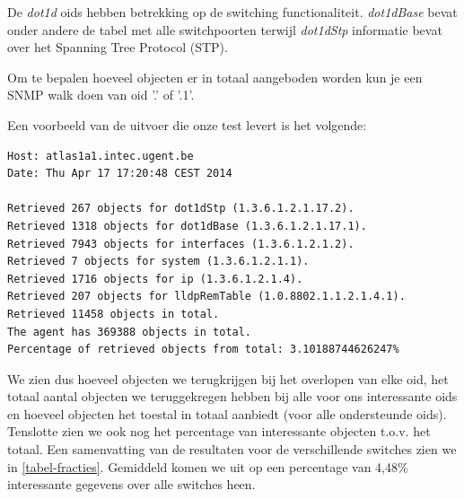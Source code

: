 De \textit{dot1d} \glspl{oid} hebben betrekking op de switching functionaliteit.
\textit{dot1dBase} bevat onder andere de tabel met alle switchpoorten terwijl \textit{dot1dStp} informatie bevat over het Spanning Tree Protocol (STP).

Om te bepalen hoeveel objecten er in totaal aangeboden worden kun je een SNMP walk doen van \gls{oid} '.' of '.1'.

Een voorbeeld van de uitvoer die onze test levert is het volgende:

\begin{lstlisting}
Host: atlas1a1.intec.ugent.be
Date: Thu Apr 17 17:20:48 CEST 2014

Retrieved 267 objects for dot1dStp (1.3.6.1.2.1.17.2).
Retrieved 1318 objects for dot1dBase (1.3.6.1.2.1.17.1).
Retrieved 7943 objects for interfaces (1.3.6.1.2.1.2).
Retrieved 7 objects for system (1.3.6.1.2.1.1).
Retrieved 1716 objects for ip (1.3.6.1.2.1.4).
Retrieved 207 objects for lldpRemTable (1.0.8802.1.1.2.1.4.1).
Retrieved 11458 objects in total.
The agent has 369388 objects in total.
Percentage of retrieved objects from total: 3.10188744626247%
\end{lstlisting}

We zien dus hoeveel objecten we terugkrijgen bij het overlopen van elke \gls{oid},
het totaal aantal objecten we teruggekregen hebben bij alle voor ons interessante \glspl{oid} en
hoeveel objecten het toestal in totaal aanbiedt (voor alle ondersteunde \glspl{oid}).
Tenslotte zien we ook nog het percentage van interessante objecten t.o.v. het totaal.
Een samenvatting van de resultaten voor de verschillende switches zien we in \cref{tabel-fracties}.
Gemiddeld komen we uit op een percentage van 4,48\% interessante gegevens over alle switches heen.

